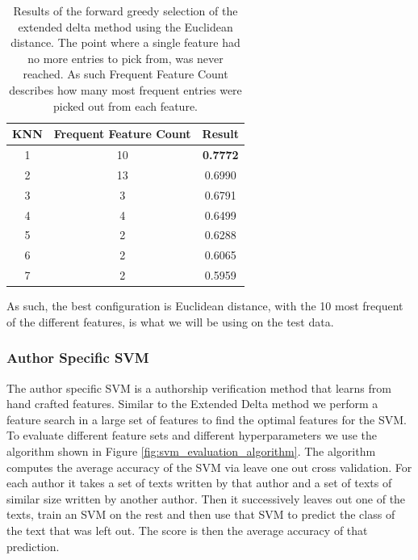 \begin{table}[]
    \centering
    \begin{tabular}{|c|c|c|}
    \hline
    KNN & Frequent Feature Count & Result          \\ \hline
    1   & 10                     & \textbf{0.7772} \\ \hline
    2   & 13                     & 0.6990          \\ \hline
    3   & 3                      & 0.6791          \\ \hline
    4   & 4                      & 0.6499          \\ \hline
    5   & 2                      & 0.6288          \\ \hline
    6   & 2                      & 0.6065          \\ \hline
    7   & 2                      & 0.5959          \\ \hline
    \end{tabular}
    \caption{Results of the forward greedy selection of the extended delta
        method using the Euclidean distance. The point where a single feature
        had no more entries to pick from, was never reached. As such Frequent
        Feature Count describes how many most frequent entries were picked out
        from each feature.}
    \label{fig:resultsEuc}
\end{table}

As such, the best configuration is Euclidean distance, with the 10 most frequent
of the different features, is what we will be using on the test data.

\subsubsection{Author Specific SVM}

The author specific SVM is a authorship verification method that learns from
hand crafted features. Similar to the Extended Delta method we perform a feature
search in a large set of features to find the optimal features for the SVM. To
evaluate different feature sets and different hyperparameters we use the
algorithm shown in Figure \ref{fig:svm_evaluation_algorithm}. The algorithm
computes the average accuracy of the SVM via leave one out cross validation. For
each author it takes a set of texts written by that author and a set of texts of
similar size written by another author. Then it successively leaves out one of
the texts, train an SVM on the rest and then use that SVM to predict the class
of the text that was left out. The score is then the average accuracy of that
prediction.

